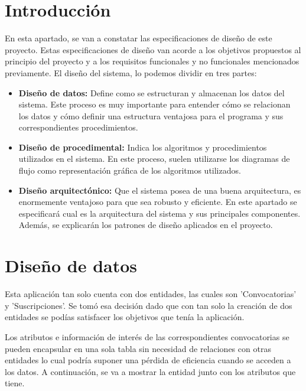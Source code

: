 
\section{Introducción}

En esta apartado, se van a constatar las especificaciones de diseño de este proyecto. Estas especificaciones de diseño van acorde a los objetivos propuestos al principio del proyecto y a los requisitos funcionales y no funcionales mencionados previamente. El diseño del sistema, lo podemos dividir en tres partes:

\begin{itemize}
    \item \textbf{Diseño de datos:} Define como se estructuran y almacenan los datos del sistema. Este proceso es muy importante para entender cómo se relacionan los datos y cómo definir una estructura ventajosa para el programa y sus correspondientes procedimientos.
    \item \textbf{Diseño de procedimental:} Indica los algoritmos y procedimientos utilizados en el sistema. En este proceso, suelen utilizarse los diagramas de flujo como representación gráfica de los algoritmos utilizados. 
    \item \textbf{Diseño arquitectónico:} Que el sistema posea de una buena arquitectura, es enormemente ventajoso para que sea robusto y eficiente. En este apartado se especificará cual es la arquitectura del sistema y sus principales componentes. Además, se explicarán los patrones de diseño aplicados en el proyecto.
\end{itemize}

\section{Diseño de datos}

Esta aplicación tan solo cuenta con dos entidades, las cuales son 'Convocatorias' y 'Suscripciones'. Se tomó esa decisión dado que con tan solo la creación de dos entidades se podías satisfacer los objetivos que tenía la aplicación.

Los atributos e información de interés de las correspondientes convocatorias se pueden encapsular en una sola tabla sin necesidad de relaciones con otras entidades lo cual podría suponer una pérdida de eficiencia cuando se acceden a los datos. A continuación, se va a mostrar la entidad junto con los atributos que tiene.


